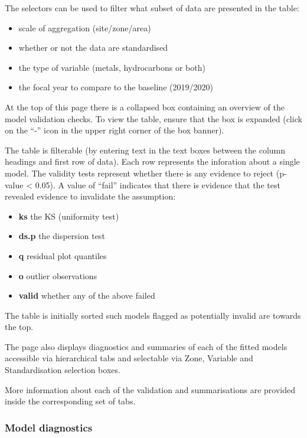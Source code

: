\documentclass[
  8pt,
  a4paper]{article}
\providecommand{\tightlist}{%
  \setlength{\itemsep}{0pt}\setlength{\parskip}{0pt}}\usepackage{longtable,booktabs,array}
\begin{document}
The selectors can be used to filter what subset of data are presented in
the table:

\begin{itemize}
\tightlist
\item
  scale of aggregation (site/zone/area)
\item
  whether or not the data are standardised
\item
  the type of variable (metals, hydrocarbons or both)
\item
  the focal year to compare to the baseline (2019/2020)
\end{itemize}

At the top of this page there is a collapsed box containing an overview
of the model validation checks. To view the table, ensure that the box
is expanded (click on the ``-'' icon in the upper right corner of the
box banner).

The table is filterable (by entering text in the text boxes between the
column headings and first row of data). Each row represents the
inforation about a single model. The validity tests represent whether
there is any evidence to reject (p-value \textless{} 0.05). A value of
``fail'' indicates that there is evidence that the test revealed
evidence to invalidate the assumption:

\begin{itemize}
\tightlist
\item
  \textbf{ks} the KS (uniformity test)
\item
  \textbf{ds.p} the dispersion test
\item
  \textbf{q} residual plot quantiles
\item
  \textbf{o} outlier observations
\item
  \textbf{valid} whether any of the above failed
\end{itemize}

The table is initially sorted such models flagged as potentially invalid
are towards the top.

The page also displays diagnostics and summaries of each of the fitted
models accessible via hierarchical tabs and selectable via Zone,
Variable and Standardisation selection boxes.

More information about each of the validation and summarisations are
provided inside the corresponding set of tabs.

\subsubsection{Model diagnostics}\label{model-diagnostics}
\end{document}
